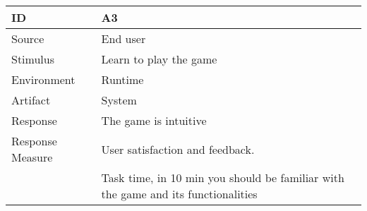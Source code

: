 \begin{center}
	\begin{tabular}{ | l | p{12cm} |}
	\hline
	\textbf{ID} & \textbf{A3} \\ \hline
	Source & End user \\ \hline
	Stimulus & Learn to play the game \\ \hline
	Environment & Runtime \\ \hline
	Artifact & System \\ \hline
	Response & The game is intuitive \\ \hline
	Response Measure &  User satisfaction and feedback. \\
				& Task time, in 10 min you should be familiar with the game and its functionalities \\ \hline
					
	\hline
	\end{tabular}
\end{center}


